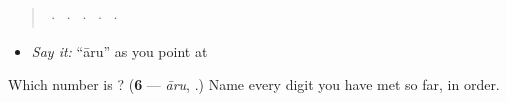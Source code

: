 \begin{quote}
  ·    ·    ·    ·    ·  
\end{quote}

\begin{itemize}
\raggedright
  \item \emph{Say it:} \textquotedblleft{}āru\textquotedblright{} as you point at 
\end{itemize}

\begin{tcolorbox}[breakable,colback=teal!4,colframe=teal!35!black,title={Before you move on}]
Which number is \textbf{}? (\textbf{6} — \emph{āru}, .) Name every digit you have met so far, in order.
\end{tcolorbox}
